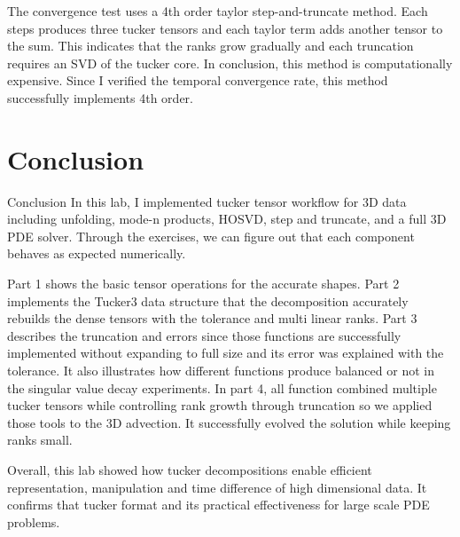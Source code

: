 \documentclass[11pt]{article}
\begin{document}
The convergence test uses a 4th order taylor step-and-truncate method. Each steps produces three tucker tensors and each taylor term adds another tensor to the sum. This indicates that the ranks grow gradually and each truncation requires an SVD of the tucker core. In conclusion, this method is computationally expensive. Since I verified the temporal convergence rate, this method successfully implements 4th order.
\section*{Conclusion}
{Conclusion}
In this lab, I implemented tucker tensor workflow for 3D data including unfolding, mode-n products, HOSVD, step and truncate, and a full 3D PDE solver. Through the exercises, we can figure out that each component behaves as expected numerically.

\vspace{2em}

Part 1 shows the basic tensor operations for the accurate shapes. Part 2 implements the Tucker3 data structure that the decomposition accurately rebuilds the dense tensors with the tolerance and multi linear ranks. Part 3 describes the truncation and errors since those functions are successfully implemented without expanding to full size and its error was explained with the tolerance. It also illustrates how different functions produce balanced or not in the singular value decay experiments. In part 4, all function combined multiple tucker tensors while controlling rank growth through truncation so we applied those tools to the 3D advection. It successfully evolved the solution while keeping ranks small.

\vspace{2em}

Overall, this lab showed how tucker decompositions enable efficient representation, manipulation and time difference of high dimensional data. It confirms that tucker format and its practical effectiveness for large scale PDE problems.


 

\end{document}
